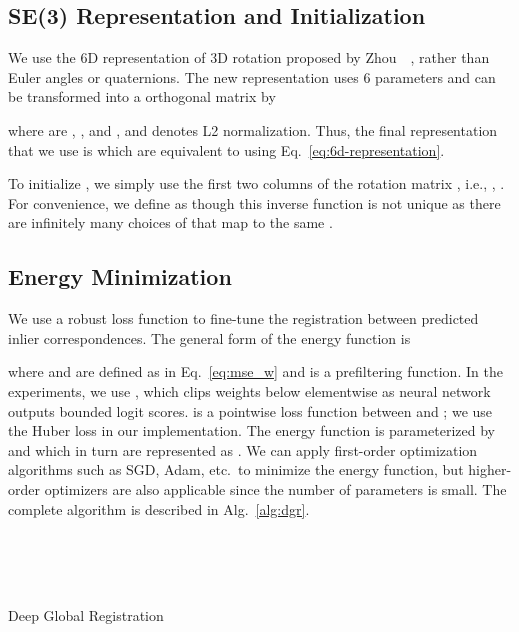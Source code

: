 \documentclass[10pt,twocolumn,letterpaper]{article}
\begin{document}
\newcommand{\ba}{\mathbf{a}}
\newcommand{\bb}{\mathbf{b}}
\newcommand{\bt}{\mathbf{t}}
\newcommand{\bx}{\mathbf{x}}
\newcommand{\by}{\mathbf{y}}
\subsection{SE(3) Representation and Initialization}
\label{sec:se3_representation}

We use the 6D representation of 3D rotation proposed by Zhou~\etal~\cite{zhou2019continuity}, rather than Euler angles or quaternions. The new representation uses 6 parameters  and can be transformed into a  orthogonal matrix by

where  are , , and , and  denotes L2 normalization.
Thus, the final representation that we use is  which are equivalent to  using Eq.~\ref{eq:6d-representation}.

To initialize , we simply use the first two columns of the rotation matrix , i.e., , . For convenience, we define  as  though this inverse function is not unique as there are infinitely many choices of  that map to the same .



\subsection{Energy Minimization}

We use a robust loss function to fine-tune the registration between predicted inlier correspondences. The general form of the energy function is

where  and  are defined as in Eq.~\ref{eq:mse_w} and  is a prefiltering function. In the experiments, we use , which clips weights below  elementwise as neural network outputs bounded logit scores.  is a pointwise loss function between  and ; we use the Huber loss in our implementation. 
The energy function is parameterized by  and  which in turn are represented as . We can apply first-order optimization algorithms such as SGD, Adam, etc.\ to minimize the energy function, but higher-order optimizers are also applicable since the number of parameters is small.
The complete algorithm is described in Alg.~\ref{alg:dgr}. 
\begin{algorithm}[t]
\DontPrintSemicolon
\KwInput{} 
\KwOutput{}
         
    \tcp*{\S~\ref{sec:features}}
    \\
         \tcp*{\S~\ref{sec:6dconvnet}}
     \\
     \\
    
\caption{Deep Global Registration}\label{alg:dgr}
\end{algorithm}
\end{document}
